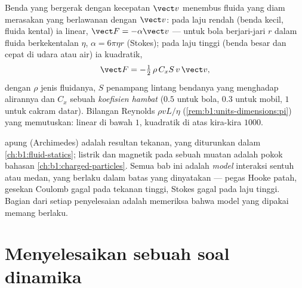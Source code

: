 \begin{proposition}\label{prop:b1:newton-dynamics:drag}
Benda yang bergerak dengan kecepatan $\vect v$ menembus fluida yang diam
merasakan \emph{} yang berlawanan dengan $\vect v$: pada laju
rendah (benda kecil, fluida kental) ia linear,
$\vect F = -\alpha\vect v$ --- untuk bola berjari-jari $r$ dalam fluida
berkekentalan $\eta$, $\alpha = 6\pi\eta r$ (Stokes); pada laju tinggi
(benda besar dan cepat di udara atau air) ia kuadratik,
\[
\vect F = -\tfrac12\,\rho\,C_xS\,v\,\vect v ,
\]
dengan $\rho$  jenis fluidanya, $S$ penampang lintang bendanya yang
menghadap alirannya dan $C_x$ sebuah \emph{koefisien hambat}  ($0.5$ untuk bola, $0.3$ untuk mobil, $1$ untuk cakram
datar). Bilangan Reynolds $\rho vL/\eta$
(\cref{rem:b1:units-dimensions:pi}) yang memutuskan: linear di bawah
$1$, kuadratik di atas kira-kira $1000$.
\end{proposition}
\admitted

\begin{remark}\label{rem:b1:newton-dynamics:others}
 apung (Archimedes) adalah resultan  tekanan, yang diturunkan
dalam \cref{ch:b1:fluid-statics};  listrik dan  magnetik pada
sebuah muatan adalah pokok bahasan \cref{ch:b1:charged-particles}.
Semua  bab ini adalah \emph{model} interaksi sentuh atau medan, yang
berlaku dalam batas yang dinyatakan --- pegas Hooke patah, gesekan
Coulomb gagal pada tekanan tinggi,  Stokes gagal pada laju
tinggi. Bagian dari setiap penyelesaian adalah memeriksa bahwa model
yang dipakai memang berlaku.
\end{remark}

\section{Menyelesaikan sebuah soal dinamika}

